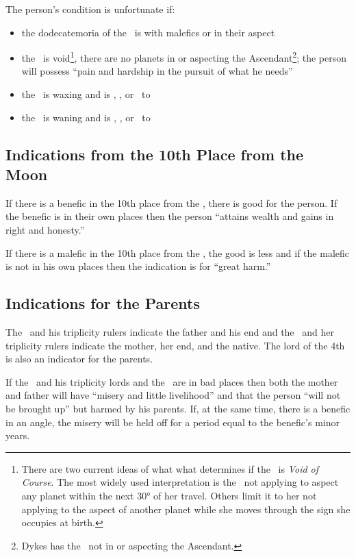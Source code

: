 \noindent The person's condition is unfortunate if:
\begin{itemize}[topsep=0em,itemsep=0em]
\item the dodecatemoria of the \Moon\, is with malefics or in their aspect
\item the \Moon\, is void\footnote{There are two current ideas of what what determines if the \Moon\, is \textsl{Void of Course}. The most widely used interpretation is the \Moon\, not applying to aspect any planet within the next 30° of her travel. Others limit it to her not applying to the aspect of another planet while she moves through the sign she occupies at birth.}, there are no planets in or aspecting the Ascendant\footnote{Dykes has the \Moon\, not in or aspecting the Ascendant.}; the  person will possess ``pain and hardship in the pursuit of what he needs''
\item the \Moon\, is waxing and is \Conjunction, \Opposition, or \Square\, to \Mars
\item the \Moon\, is waning and is \Conjunction, \Opposition, or \Square\, to \Saturn
\end{itemize}

\subsection{Indications from the 10th Place from the Moon}

If there is a benefic in the 10th place from the \Moon, there is good for the person. If the benefic is in their own places then the person ``attains wealth and gains in right and honesty.''

If there is a malefic in the 10th place from the \Moon, the good is less and if the malefic is not in his own places then the indication is for ``great harm.''

\subsection{Indications for the Parents}
The \Sun\, and his triplicity rulers indicate the father and his end and the \Moon\, and her triplicity rulers indicate the mother, her end, and the native. The lord of the 4th is also an indicator for the parents.

If the \Sun\, and his triplicity lords and the \Moon\, are in bad places then both the mother and father will have ``misery and little livelihood'' and that the person ``will not be brought up'' but harmed by his parents. If, at the same time, there is a benefic in an angle, the misery will be held off for a period equal to the benefic's minor years.

